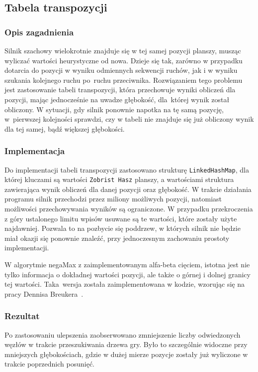 \usepackage{biblatex}\subsection{Tabela transpozycji}
\label{subsec:tabela-transpozycji}

\subsubsection{Opis zagadnienia}
Silnik szachowy wielokrotnie znajduje się w tej samej pozycji planszy, musząc wyliczać wartości heurystyczne od nowa.
Dzieje się tak, zarówno w przypadku dotarcia do pozycji w wyniku odmiennych sekwencji ruchów, jak i w wyniku szukania kolejnego ruchu po~ruchu przeciwnika.
Rozwiązaniem tego problemu jest zastosowanie tabeli transpozycji, która przechowuje wyniki obliczeń dla pozycji, mając jednocześnie na uwadze głębokość, dla~której wynik został obliczony.
W sytuacji, gdy silnik ponownie napotka na tę samą pozycję, w~pierwszej kolejności sprawdzi, czy w tabeli nie znajduje się już obliczony wynik dla tej samej, bądź większej głębokości.

\subsubsection{Implementacja}
Do implementacji tabeli transpozycji zastosowano strukturę \texttt{LinkedHashMap}, dla której kluczami są wartości \texttt{Zobrist Hasz} planszy, a wartościami struktura zawierająca wynik obliczeń dla danej pozycji oraz głębokość.
W trakcie działania programu silnik przechodzi przez miliony możliwych pozycji, natomiast możliwości przechowywania wyników są ograniczone.
W przypadku przekroczenia z góry ustalonego limitu wpisów usuwane są te wartości, które zostały użyte najdawniej.
Pozwala to na pozbycie się poddrzew, w których silnik nie będzie miał okazji się ponownie znaleźć, przy jednoczesnym zachowaniu prostoty implementacji.

W algorytmie negaMax z zaimplementowanym alfa-beta cięciem, istotna jest nie tylko informacja o dokładnej wartości pozycji, ale także o górnej i dolnej granicy tej wartości.
Taka~wersja została zaimplementowana w kodzie, wzorując się na pracy Dennisa Breukera~\cite*{transposition-phd}.

\subsubsection{Rezultat}
Po zastosowaniu ulepszenia zaobserwowano zmniejszenie liczby odwiedzonych węzłów w trakcie przeszukiwania drzewa gry.
Było to szczególnie widoczne przy mniejszych głębokościach, gdzie w dużej mierze pozycje zostały już wyliczone w trakcie poprzednich posunięć.
